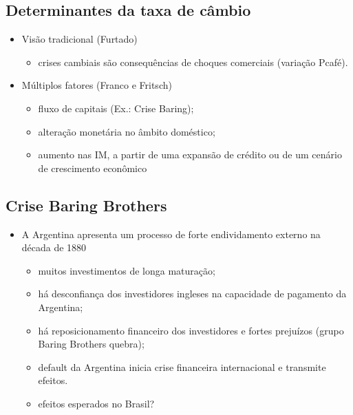 \documentclass[a4paper,12pt]{article}[abntex2]
\begin{document}
\subsection{\textbf{Determinantes da taxa de câmbio}}
\begin{itemize}
    \item Visão tradicional (Furtado)
    \begin{itemize}
        \item  crises cambiais são consequências de choques comerciais (variação Pcafé).
    \end{itemize}
    \item Múltiplos fatores (Franco e Fritsch)
    \begin{itemize}
        \item fluxo de capitais (Ex.: Crise Baring);
    \end{itemize}
    \begin{itemize}
        \item alteração monetária no âmbito doméstico;
    \end{itemize}
    \begin{itemize}
        \item aumento nas IM, a partir de uma expansão de crédito ou de um cenário de crescimento econômico
    \end{itemize}
\end{itemize}
\subsection{\textbf{Crise Baring Brothers}}
\begin{itemize}
    \item A Argentina apresenta um processo de forte endividamento externo na década de 1880
    \begin{itemize}
        \item muitos investimentos de longa maturação;
    \end{itemize}
    \begin{itemize}
        \item há desconfiança dos investidores ingleses na capacidade de pagamento da Argentina;
    \end{itemize}
    \begin{itemize}
        \item há reposicionamento financeiro dos investidores e fortes prejuízos (grupo Baring Brothers quebra);
    \end{itemize}
    \begin{itemize}
        \item default da Argentina inicia crise financeira internacional e transmite efeitos.
    \end{itemize}
    \begin{itemize}
        \item  efeitos esperados no Brasil?
    \end{itemize}
\end{itemize}
\end{document}
